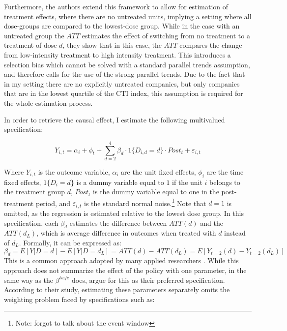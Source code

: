 \documentclass[12pt]{article}
\begin{document}
Furthermore, the authors extend this framework to allow for estimation of treatment effects, where there are no untreated units, implying a setting where all dose-groups are compared to the lowest-dose group. While in the case with an untreated group the $ATT$ estimates the effect of switching from no treatment to a treatment of dose $d$, they show that in this case, the $ATT$ compares the change from low-intensity treatment to high intensity treatment. This introduces a selection bias which cannot be solved with a standard parallel trends assumption, and therefore calls for the use of the strong parallel trends. Due to the fact that in my setting there are no explicitly untreated companies, but only companies that are in the lowest quartile of the CTI index, this assumption is required for the whole estimation process.

In order to retrieve the causal effect, I estimate the following multivalued specification:

\begin{equation}
    Y_{i,t} = \alpha_i + \phi_t + \sum_{d=2}^{4} \beta_d \cdot 1\{D_{i,d}=d\}\cdot Post_t + \varepsilon_{i,t}
\end{equation}

Where $Y_{i,t}$ is the outcome variable, $\alpha_i$ are the unit fixed effects, $\phi_i$ are the time fixed effects, $1\{D_{i}=d\}$ is a dummy variable equal to $1$ if the unit $i$ belongs to the treatment group $d$, $Post_t$ is the dummy variable equal to one in the post-treatment period, and $\varepsilon_{i,t}$ is the standard normal noise.\footnote{Note: forgot to talk about the event window} Note that $d=1$ is omitted, as the regression is estimated relative to the lowest dose group. In this specification, each $\beta_d$ estimates the difference between $ATT(d)$ and the $ATT(d_L)$, which is average difference in outcomes when treated with $d$ instead of $d_L$. Formally, it can be expressed as: 
\begin{equation}
    \beta_d = E[Y|D = d] - E[Y |D = d_L] = ATT(d) - ATT(d_L) = E[Y_{t=2}(d) - Y_{t=2}(d_L)]
\end{equation}
This is a common approach adopted by many applied researchers \parencite{acemoglu_finkelstein_medicare,deschenes_greenstone_clim_change}. While this approach does not summarize the effect of the policy with one parameter, in the same way as the $\beta^{twfe}$ does, \citeauthor{callawayDifferenceindifferencesContinuousTreatment2024} argue for this as their preferred specification. According to their study, estimating these parameters separately omits the weighting problem faced by specifications such as:
\end{document}
